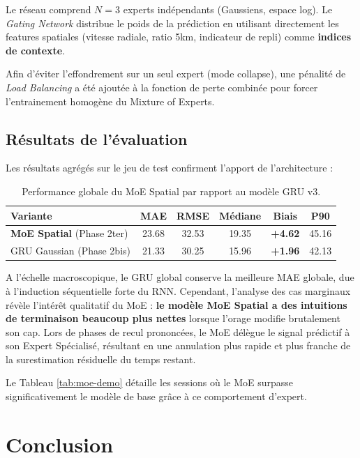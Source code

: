 \documentclass[11pt,a4paper]{article}
\begin{document}
Le réseau comprend $N=3$ experts indépendants (Gaussiens, espace log). Le \emph{Gating Network} distribue le poids de la prédiction en utilisant directement les features spatiales (vitesse radiale, ratio 5km, indicateur de repli) comme \textbf{indices de contexte}.

Afin d'éviter l'effondrement sur un seul expert (mode collapse), une pénalité de \emph{Load Balancing} a été ajoutée à la fonction de perte combinée pour forcer l'entrainement homogène du Mixture of Experts.

\subsection{Résultats de l'évaluation}

Les résultats agrégés sur le jeu de test confirment l'apport de l'architecture :

\begin{table}[H]
\centering
\small
\begin{tabular}{@{}lccccc@{}}
\toprule
\textbf{Variante} & \textbf{MAE} & \textbf{RMSE} & \textbf{Médiane} & \textbf{Biais} & \textbf{P90} \\
\midrule
\textbf{MoE Spatial} (Phase 2ter) & 23.68 & 32.53 & 19.35 & \textbf{+4.62} & 45.16 \\
GRU Gaussian (Phase 2bis) & 21.33 & 30.25 & 15.96 & \textbf{+1.96} & 42.13 \\
\bottomrule
\end{tabular}
\caption{Performance globale du MoE Spatial par rapport au modèle GRU v3.}
\end{table}

A l'échelle macroscopique, le GRU global conserve la meilleure MAE globale, due à l'induction séquentielle forte du RNN.
Cependant, l'analyse des cas marginaux révèle l'intérêt qualitatif du MoE : \textbf{le modèle MoE Spatial a des intuitions de terminaison beaucoup plus nettes} lorsque l'orage modifie brutalement son cap. Lors de phases de recul prononcées, le MoE délègue le signal prédictif à son Expert Spécialisé, résultant en une annulation plus rapide et plus franche de la surestimation résiduelle du temps restant.

Le Tableau \ref{tab:moe-demo} détaille les sessions où le MoE surpasse significativement le modèle de base grâce à ce comportement d'expert.


\section{Conclusion}
\end{document}
